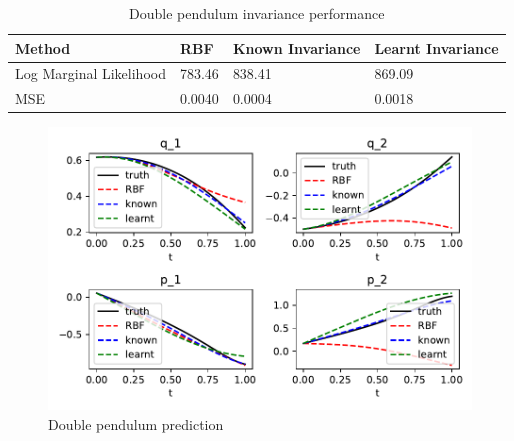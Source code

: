 \documentclass{statsmsc}
\begin{document}
\begin{table}[H]
  \centering
  \begin{tabular}{l l l l}
    \hline
Method           & RBF & Known Invariance&  Learnt Invariance\\
  \hline
Log Marginal Likelihood & 783.46 & 838.41 & 869.09  \\
MSE & 0.0040 & 0.0004 & 0.0018 \\
    \hline
  \end{tabular}
  \caption{Double pendulum invariance performance}
  \label{tab:double_pendulum_performance}
\end{table}

\begin{figure}[H] 
  \includegraphics[width=0.8\linewidth]{../codes/figures/double_pendulum_predicted.pdf}
  \centering
  \caption{Double pendulum prediction}
  \label{fig:double_pendulum_prediction}
\end{figure}
\end{document}
